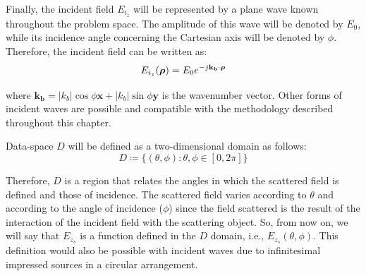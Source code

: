 		Finally, the incident field $E_{i_z}$ will be represented by a plane wave known throughout the problem space. The amplitude of this wave will be denoted by $E_0$, while its incidence angle concerning the Cartesian axis will be denoted by $\phi$. Therefore, the incident field can be written as:
 		\begin{equation}
 			E_{i_z}(\boldsymbol{\rho}) = E_0e^{-j\mathbf{k_b}\cdot\boldsymbol{\rho}} \label{eq:3:definition:2}
 		\end{equation}
 	
 		\noindent where $\mathbf{k_b} = |k_b|\cos\phi\mathbf{x} + |k_b|\sin\phi\mathbf{y}$ is the wavenumber vector. Other forms of incident waves are possible and compatible with the methodology described throughout this chapter.
 		
 		Data-space $D$ will be defined as a two-dimensional domain as follows:
 		\begin{equation}
 			D \coloneqq \{(\theta,\phi) : \theta, \phi \in [0,2\pi] \} \label{eq:3:definition:3}
 		\end{equation}
 	
 		Therefore, $D$ is a region that relates the angles in which the scattered field is defined and those of incidence. The scattered field varies according to $\theta$ and according to the angle of incidence ($\phi$) since the field scattered is the result of the interaction of the incident field with the scattering object. So, from now on, we will say that $E_{z_s}$ is a function defined in the $D$ domain, i.e., $E_{z_s}(\theta,\phi)$. This definition would also be possible with incident waves due to infinitesimal impressed sources in a circular arrangement.
 		
